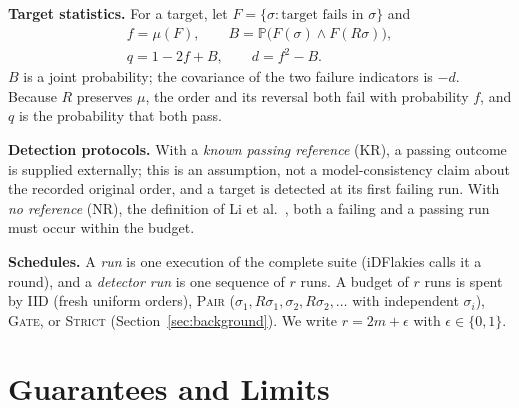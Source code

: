 \documentclass[conference,letterpaper]{IEEEtran}
\theoremstyle{definition}
\newcommand{\Prb}{\mathbb{P}}
\newcommand{\IIDp}{\textup{\textsc{IID}}}
\newcommand{\PAIRp}{\textup{\textsc{Pair}}}
\newcommand{\GATEp}{\textup{\textsc{Gate}}}
\newcommand{\STRICTp}{\textup{\textsc{Strict}}}
\begin{document}
\textbf{Target statistics.} For a target, let $F=\{\sigma: \text{target fails in }\sigma\}$ and
\begin{gather*}
f=\mu(F),\qquad B=\Prb\big(F(\sigma)\wedge F(R\sigma)\big),\\
q=1-2f+B,\qquad d=f^2-B .
\end{gather*}
$B$ is a joint probability; the covariance of the two failure indicators is $-d$. Because $R$ preserves $\mu$, the order and its reversal both fail with probability $f$, and $q$ is the probability that both pass.

\textbf{Detection protocols.} With a \emph{known passing reference} (KR), a passing outcome is supplied externally; this is an assumption, not a model-consistency claim about the recorded original order, and a target is detected at its first failing run. With \emph{no reference} (NR), the definition of Li et al.~\cite{li2023issta}, both a failing and a passing run must occur within the budget.

\textbf{Schedules.} A \emph{run} is one execution of the complete suite (iDFlakies calls it a round), and a \emph{detector run} is one sequence of $r$ runs. A budget of $r$ runs is spent by \IIDp{} (fresh uniform orders), \PAIRp{} ($\sigma_1,R\sigma_1,\sigma_2,R\sigma_2,\dots$ with independent $\sigma_i$), \GATEp{}, or \STRICTp{} (Section~\ref{sec:background}). We write $r=2m+\epsilon$ with $\epsilon\in\{0,1\}$.

\section{Guarantees and Limits}\label{sec:theory}
\end{document}
